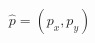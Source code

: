 \documentclass[preview]{standalone}
\begin{document}
\begin{align*}
\hat{p}=(p_x, p_y)
\end{align*}
\end{document}
